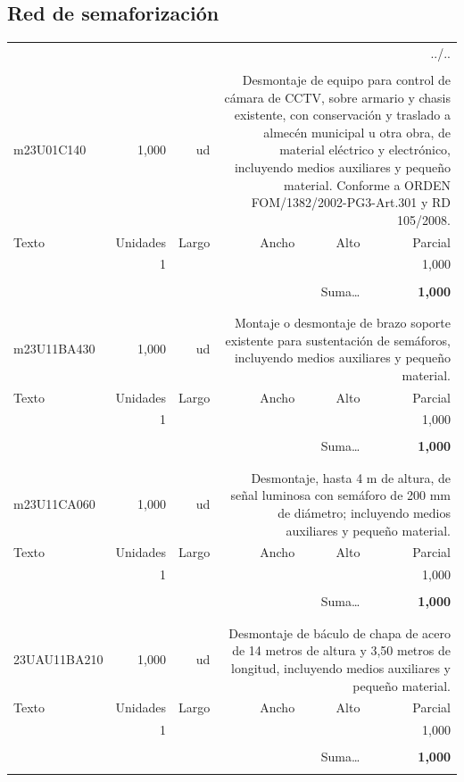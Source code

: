 \documentclass{book}%
\begin{document}
\subsection{Red de semaforización}%
\begin{longtable}{lrrrrr}%
\multicolumn{6}{r}{../..}\\%
\endfoot%
\endlastfoot%
&&&&&\\%
m23U01C140&     1,000& ud&\multicolumn{3}{p{6cm}}{\scriptsize Desmontaje de equipo para control de cámara de CCTV, sobre armario y chasis existente, con conservación y traslado a almecén municipal u otra obra, de material eléctrico y electrónico, incluyendo medios auxiliares y pequeño material. Conforme a ORDEN FOM/1382/2002-PG3-Art.301 y RD 105/2008.\normalsize}\\%
Texto&Unidades&Largo&Ancho&Alto&Parcial\\%
\hline%
\multicolumn{1}{p{3.5cm}}{ }&1&&&&     1,000\\%
&&&&&\\%
\multicolumn{5}{r}{Suma\ldots}&\textbf{     1,000}\\%
\hline%
&&&&&\\%
&&&&&\\%
m23U11BA430&     1,000& ud&\multicolumn{3}{p{6cm}}{\scriptsize Montaje o desmontaje de brazo soporte existente para sustentación de semáforos, incluyendo medios auxiliares y pequeño material.\normalsize}\\%
Texto&Unidades&Largo&Ancho&Alto&Parcial\\%
\hline%
\multicolumn{1}{p{3.5cm}}{ }&1&&&&     1,000\\%
&&&&&\\%
\multicolumn{5}{r}{Suma\ldots}&\textbf{     1,000}\\%
\hline%
&&&&&\\%
&&&&&\\%
m23U11CA060&     1,000& ud&\multicolumn{3}{p{6cm}}{\scriptsize Desmontaje, hasta 4 m de altura, de señal luminosa con semáforo de 200 mm de diámetro; incluyendo medios auxiliares y pequeño material.\normalsize}\\%
Texto&Unidades&Largo&Ancho&Alto&Parcial\\%
\hline%
\multicolumn{1}{p{3.5cm}}{ }&1&&&&     1,000\\%
&&&&&\\%
\multicolumn{5}{r}{Suma\ldots}&\textbf{     1,000}\\%
\hline%
&&&&&\\%
&&&&&\\%
23UAU11BA210&     1,000& ud&\multicolumn{3}{p{6cm}}{\scriptsize Desmontaje de báculo de chapa de acero de 14 metros de altura y 3,50 metros de longitud, incluyendo medios auxiliares y pequeño material.\normalsize}\\%
Texto&Unidades&Largo&Ancho&Alto&Parcial\\%
\hline%
\multicolumn{1}{p{3.5cm}}{ }&1&&&&     1,000\\%
&&&&&\\%
\multicolumn{5}{r}{Suma\ldots}&\textbf{     1,000}\\%
\hline%
&&&&&\\%
\end{longtable}%
\newpage
\end{document}
